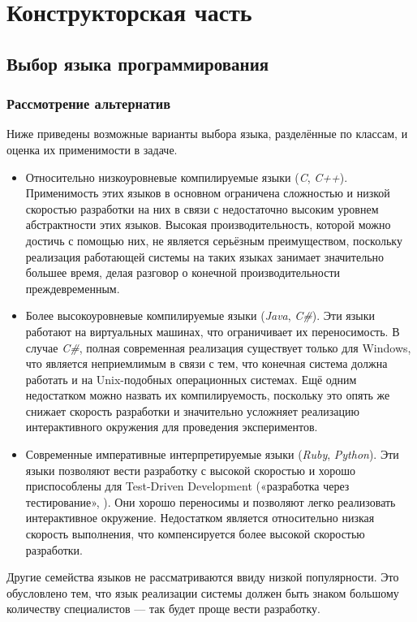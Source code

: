 \section{Конструкторская часть}
\subsection{Выбор языка программирования}
\subsubsection{Рассмотрение альтернатив}
Ниже приведены возможные варианты выбора языка, разделённые по классам, и оценка их применимости в задаче.
\begin{itemize}
    \item Относительно низкоуровневые компилируемые языки (\textit{C}, \textit{C++}). Применимость этих языков в основном ограничена сложностью и низкой скоростью разработки на них в связи с недостаточно высоким уровнем абстрактности этих языков. Высокая производительность, которой можно достичь с помощью них, не является серьёзным преимуществом, поскольку реализация работающей системы на таких языках занимает значительно большее время, делая разговор о конечной производительности преждевременным.
    \item Более высокоуровневые компилируемые языки (\textit{Java}, \textit{C\#}). Эти языки работают на виртуальных машинах, что ограничивает их переносимость. В случае \textit{C\#}, полная современная реализация существует только для Windows, что является неприемлимым в связи с тем, что конечная система должна работать и на Unix-подобных операционных системах. Ещё одним недостатком можно назвать их компилируемость, поскольку это опять же снижает скорость разработки и значительно усложняет реализацию интерактивного окружения для проведения экспериментов.
    \item Современные императивные интерпретируемые языки (\textit{Ruby}, \textit{Python}). Эти языки позволяют вести разработку с высокой скоростью и хорошо приспособлены для Test-Driven Development («разработка через тестирование», \cite{tdd}). Они хорошо переносимы и позволяют легко реализовать интерактивное окружение. Недостатком является относительно низкая скорость выполнения, что компенсируется более высокой скоростью разработки.
\end{itemize}
Другие семейства языков не рассматриваются ввиду низкой популярности. Это обусловлено тем, что язык реализации системы должен быть знаком большому количеству специалистов --- так будет проще вести  разработку.


